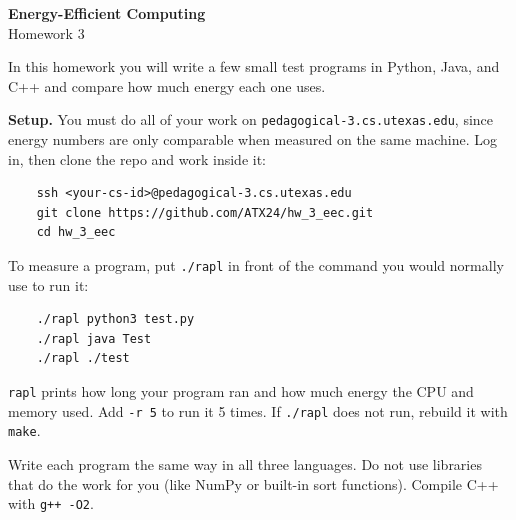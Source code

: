 \documentclass[11pt]{article}
\begin{document}
\begin{center}
  {\Large \textbf{Energy-Efficient Computing}}\\[4pt]
  {\large Homework 3}
\end{center}

In this homework you will write a few small test programs in Python, Java, and C++ and
compare how much energy each one uses.

\textbf{Setup.} You must do all of your work on \texttt{pedagogical-3.cs.utexas.edu}, since
energy numbers are only comparable when measured on the same machine. Log in, then clone
the repo and work inside it:

\begin{verbatim}
    ssh <your-cs-id>@pedagogical-3.cs.utexas.edu
    git clone https://github.com/ATX24/hw_3_eec.git
    cd hw_3_eec
\end{verbatim}

To measure a program, put \texttt{./rapl} in front of the command you would normally use
to run it:

\begin{verbatim}
    ./rapl python3 test.py
    ./rapl java Test
    ./rapl ./test
\end{verbatim}

\texttt{rapl} prints how long your program ran and how much energy the CPU and memory
used. Add \mbox{\texttt{-r 5}} to run it 5 times. If \texttt{./rapl} does not run, rebuild it
with \texttt{make}.

Write each program the same way in all three languages. Do not use libraries that do the
work for you (like NumPy or built-in sort functions). Compile C++ with \texttt{g++ -O2}.
\end{document}
